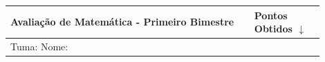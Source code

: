 \documentclass[a4paper,11pt,addpoints]{exam}
\begin{document}
\noindent 
\begin{center}
	\vspace*{-3em}
\def\arraystretch{2.0}
\begin{tabular}{|p{0.7\linewidth}|p{0.2\linewidth}|}
\hline 
\textbf{Avaliação de Matemática - Primeiro Bimestre} & Pontos Obtidos $\downarrow$ \\
\hline 
\multicolumn{2}{|l|}{Tuma: \hspace{0.3\linewidth} Nome: \hspace{0.3\linewidth}} \\
\hline
\end{tabular} 
\end{center}
\begin{center}
\end{center}
\end{document}
